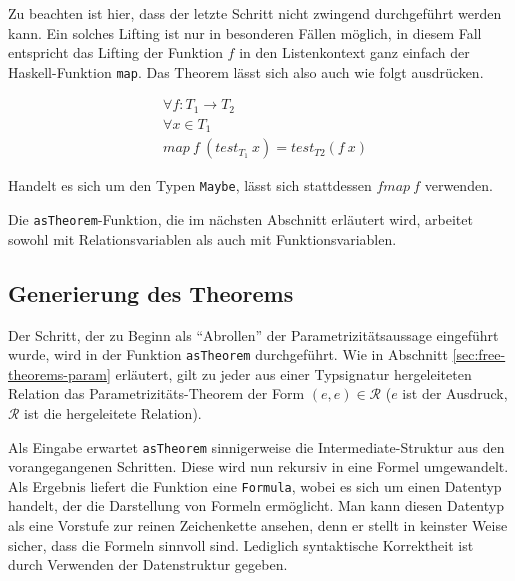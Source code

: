 Zu beachten ist hier, dass der letzte Schritt nicht zwingend durchgeführt werden kann. Ein solches Lifting ist nur in besonderen
Fällen möglich, in diesem Fall entspricht das Lifting der Funktion $f$ in den Listenkontext ganz einfach der Haskell-Funktion
\texttt{map}. Das Theorem lässt sich also auch wie folgt ausdrücken.

\begin{align*}
& \forall f : T_1 \rightarrow T_2 \\
& \forall x \in T_1 \\
& map\ f\ (test_{T_1}\ x) = test_{T2} (f\ x)
\end{align*}

Handelt es sich um den Typen \texttt{Maybe}, lässt sich stattdessen $fmap\ f$ verwenden.

Die \texttt{asTheorem}-Funktion, die im nächsten Abschnitt erläutert wird, arbeitet sowohl mit Relationsvariablen als auch mit
Funktionsvariablen.



\subsection{Generierung des Theorems}

Der Schritt, der zu Beginn als ``Abrollen'' der Parametrizitätsaussage eingeführt wurde, wird in der Funktion \texttt{asTheorem}
durchgeführt. Wie in Abschnitt \ref{sec:free-theorems-param} erläutert, gilt zu jeder aus einer Typsignatur hergeleiteten
Relation das Parametrizitäts-Theorem der Form $(e, e) \in \mathcal{R}$ ($e$ ist der Ausdruck, $\mathcal{R}$ ist die hergeleitete
Relation).

Als Eingabe erwartet \texttt{asTheorem} sinnigerweise die Intermediate-Struktur aus den vorangegangenen Schritten. Diese wird
nun rekursiv in eine Formel umgewandelt. Als Ergebnis liefert die Funktion eine \texttt{Formula}, wobei es sich um einen
Datentyp handelt, der die Darstellung von Formeln ermöglicht. Man kann diesen Datentyp als eine Vorstufe zur reinen
Zeichenkette ansehen, denn er stellt in keinster Weise sicher, dass die Formeln sinnvoll sind. Lediglich syntaktische Korrektheit
ist durch Verwenden der Datenstruktur gegeben.

